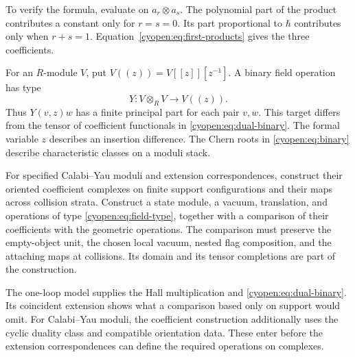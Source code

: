 To verify the formula, evaluate on
$a_r\otimes a_s$. The polynomial part of the product contributes
a constant only for $r=s=0$.
Its part proportional to $\hbar$ contributes only when $r+s=1$.
Equation~\eqref{cyopen:eq:first-products} gives the three coefficients.

For an $R$-module $V$, put $V((z))=V[[z]][z^{-1}]$.
A binary field operation has type
\begin{equation}\label{cyopen:eq:field-type}
 Y:V\otimes_R V\longrightarrow V((z)).
\end{equation}
Thus $Y(v,z)w$ has a finite principal part for each pair $v,w$.
This target differs from the tensor of coefficient functionals
in \eqref{cyopen:eq:dual-binary}.
The formal variable $z$ describes an insertion difference.
The Chern roots in \eqref{cyopen:eq:binary} describe characteristic
classes on a moduli stack.

\begin{problem}
\label{cyopen:prob:realization}
For specified Calabi--Yau moduli and extension correspondences,
construct their oriented coefficient complexes on finite support
configurations and their maps across collision strata.
Construct a state module, a vacuum, translation, and operations of type
\eqref{cyopen:eq:field-type}, together with a comparison
of their coefficients with the geometric operations.
The comparison must preserve the empty-object unit, the chosen
local vacuum, nested flag composition, and the attaching maps
at collisions. Its domain and its tensor completions are part of the construction.
\end{problem}

The one-loop model supplies the Hall multiplication and
\eqref{cyopen:eq:dual-binary}. Its coincident extension shows
what a comparison based only on support would omit.
For Calabi--Yau moduli, the coefficient construction additionally
uses the cyclic duality class and compatible orientation data.
These enter before the extension correspondences can define the
required operations on complexes.
